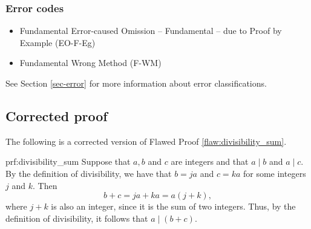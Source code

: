  
\subsubsection{Error codes}
\begin{itemize}
	\item 	Fundamental Error-caused Omission -- Fundamental -- due to Proof by Example (EO-F-Eg)
	\item Fundamental Wrong Method (F-WM)
\end{itemize}
See Section \ref{sec-error} for more information about error classifications.

\clearpage
\subsection{Corrected proof}

The following is a corrected version of Flawed Proof \ref{flaw:divisibility_sum}. 

\begin{prf}{prf:divisibility_sum} 
Suppose that $a, b$ and $c$ are integers and that $a \mid b$ and $a \mid c$. By the definition of divisibility, we have that $b = ja$ and $c = ka$ for some integers $j$ and $k$. Then
$$b + c = ja + ka = a(j+k),$$
where $j+k$ is also an integer, since it is the sum of two integers. Thus, by the definition of divisibility, it follows that  $a \mid (b+c)$.
\end{prf}
